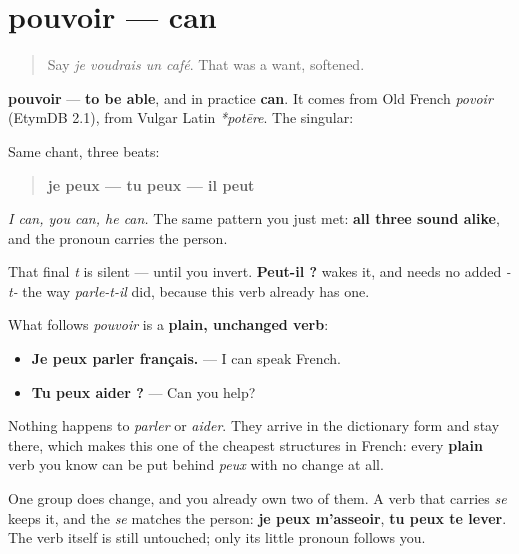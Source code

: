 \section[pouvoir]{pouvoir — can}

\label{lesson:FR-C33-pouvoir}



\begin{quote}
Say \emph{je voudrais un café}. That was a want, softened.
\end{quote}

\begin{cousinweb}
\textbf{pouvoir} — \textbf{to be able}, and in practice \textbf{can}. It comes from Old French \emph{povoir} (EtymDB 2.1), from Vulgar Latin \emph{*potēre}. The singular:

Same chant, three beats:

\begin{quote}
\textbf{je peux — tu peux — il peut}
\end{quote}

\emph{I can, you can, he can.} The same pattern you just met: \textbf{all three sound alike}, and the pronoun carries the person.

That final \emph{t} is silent — until you invert. \textbf{Peut-il ?} wakes it, and needs no added \emph{-t-} the way \emph{parle-t-il} did, because this verb already has one.

What follows \emph{pouvoir} is a \textbf{plain, unchanged verb}:

\begin{itemize}
\raggedright
  \item \textbf{Je peux parler français.} — I can speak French.
  \item \textbf{Tu peux aider ?} — Can you help?
\end{itemize}

Nothing happens to \emph{parler} or \emph{aider}. They arrive in the dictionary form and stay there, which makes this one of the cheapest structures in French: every \textbf{plain} verb you know can be put behind \emph{peux} with no change at all.

One group does change, and you already own two of them. A verb that carries \emph{se} keeps it, and the \emph{se} matches the person: \textbf{je peux m'asseoir}, \textbf{tu peux te lever}. The verb itself is still untouched; only its little pronoun follows you.
\end{cousinweb}

